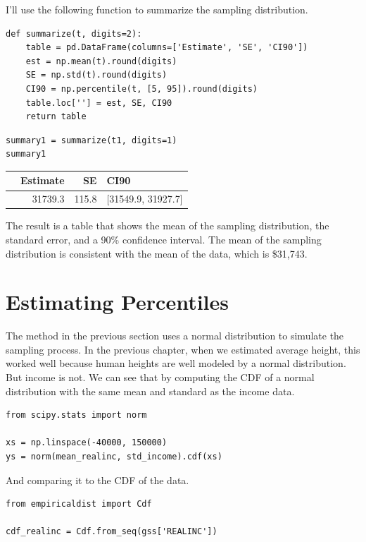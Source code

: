 I'll use the following function to summarize the sampling distribution.

\begin{lstlisting}[]
def summarize(t, digits=2):
    table = pd.DataFrame(columns=['Estimate', 'SE', 'CI90'])
    est = np.mean(t).round(digits)
    SE = np.std(t).round(digits)
    CI90 = np.percentile(t, [5, 95]).round(digits)
    table.loc[''] = est, SE, CI90
    return table
\end{lstlisting}

\begin{lstlisting}[]
summary1 = summarize(t1, digits=1)
summary1
\end{lstlisting}

\begin{tabular}{lrrl}
\midrule
{} &  Estimate &     SE &                CI90 \\
\midrule
{} &   31739.3 &  115.8 &  [31549.9, 31927.7] \\
\midrule
\end{tabular}

The result is a table that shows the mean of the sampling distribution,
the standard error, and a 90\% confidence interval. The mean of the
sampling distribution is consistent with the mean of the data, which is
\$31,743.

\hypertarget{estimating-percentiles}{%
\section{Estimating Percentiles}\label{estimating-percentiles}}

The method in the previous section uses a normal distribution to
simulate the sampling process. In the previous chapter, when we
estimated average height, this worked well because human heights are
well modeled by a normal distribution. But income is not. We can see
that by computing the CDF of a normal distribution with the same mean
and standard as the income data.

\begin{lstlisting}[]
from scipy.stats import norm

xs = np.linspace(-40000, 150000)
ys = norm(mean_realinc, std_income).cdf(xs)
\end{lstlisting}

And comparing it to the CDF of the data.

\begin{lstlisting}[]
from empiricaldist import Cdf

cdf_realinc = Cdf.from_seq(gss['REALINC'])
\end{lstlisting}

